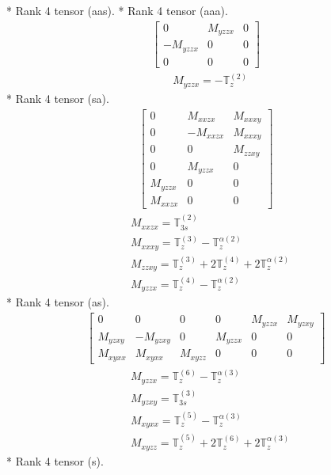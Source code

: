 \documentclass[fleqn,8pt,landscape]{jsarticle}
\begin{document}
* Rank 4 tensor (aas).
* Rank 4 tensor (aaa).
\begin{align*}
\begin{bmatrix} 0 & M_{yzzx} & 0 \\ - M_{yzzx} & 0 & 0 \\ 0 & 0 & 0 \end{bmatrix}
\end{align*}
\begin{align*}
& M_{yzzx} = - \mathbb{T}_{z}^{(2)}
\end{align*}
* Rank 4 tensor (sa).
\begin{align*}
\begin{bmatrix} 0 & M_{xxzx} & M_{xxxy} \\ 0 & - M_{xxzx} & M_{xxxy} \\ 0 & 0 & M_{zzxy} \\ 0 & M_{yzzx} & 0 \\ M_{yzzx} & 0 & 0 \\ M_{xxzx} & 0 & 0 \end{bmatrix}
\end{align*}
\begin{align*}
& M_{xxzx} = \mathbb{T}_{3s}^{(2)} \\
& M_{xxxy} = \mathbb{T}_{z}^{(3)} - \mathbb{T}_{z}^{\alpha(2)} \\
& M_{zzxy} = \mathbb{T}_{z}^{(3)} + 2 \mathbb{T}_{z}^{(4)} + 2 \mathbb{T}_{z}^{\alpha(2)} \\
& M_{yzzx} = \mathbb{T}_{z}^{(4)} - \mathbb{T}_{z}^{\alpha(2)}
\end{align*}
* Rank 4 tensor (as).
\begin{align*}
\begin{bmatrix} 0 & 0 & 0 & 0 & M_{yzzx} & M_{yzxy} \\ M_{yzxy} & - M_{yzxy} & 0 & M_{yzzx} & 0 & 0 \\ M_{xyxx} & M_{xyxx} & M_{xyzz} & 0 & 0 & 0 \end{bmatrix}
\end{align*}
\begin{align*}
& M_{yzzx} = \mathbb{T}_{z}^{(6)} - \mathbb{T}_{z}^{\alpha(3)} \\
& M_{yzxy} = \mathbb{T}_{3s}^{(3)} \\
& M_{xyxx} = \mathbb{T}_{z}^{(5)} - \mathbb{T}_{z}^{\alpha(3)} \\
& M_{xyzz} = \mathbb{T}_{z}^{(5)} + 2 \mathbb{T}_{z}^{(6)} + 2 \mathbb{T}_{z}^{\alpha(3)}
\end{align*}
* Rank 4 tensor (s).
\end{document}

